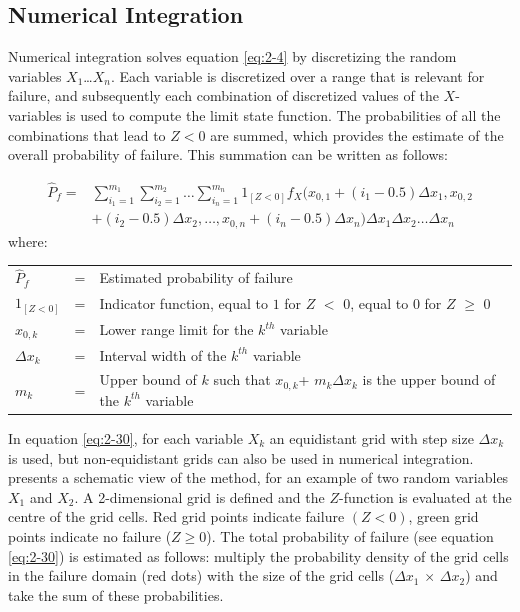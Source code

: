 \subsection{Numerical Integration\label{sec:numericalintegration}}
Numerical integration solves equation \eqref{eq:2-4} by discretizing the random variables $X_1$\dots $X_n$. Each variable is discretized over a range that is relevant for failure, and subsequently each combination of discretized values of the $X$-variables is used to compute the limit state function. The probabilities of all the combinations that lead to $Z<0$ are summed, which provides the estimate of the overall probability of failure. This summation can be written as follows:

\begin{align}
\hat{P}_{f} =&\sum _{i_{1} =1}^{m_{1} }\sum _{i_{2} =1}^{m_{2} }\dots\sum _{i_{n} =1}^{m_{n} }1_{\left[Z<0\right]}    f_{X} (x_{0,1} +(i_{1} -0.5)\Delta x_{1} ,x_{0,2}\label{eq:2-30} \\ \nonumber
 &+(i_{2} -0.5)\Delta x_{2} ,\dots,x_{0,n} +(i_{n} -0.5)\Delta x_{n} )\Delta x_{1} \Delta x_{2} \dots\Delta x_{n} 
\end{align}
where:

\begin{tabular}{p{0.4in}p{0.2in}p{4in}} 
$\hat{P}_{f} $ & = & Estimated probability of failure \\
$1_{\left[Z<0\right]} $ & = & Indicator function, equal to $1$ for $Z$ $<$ $0$, equal to $0$ for $Z$ $\geq$ $0$ \\
$x_{0,k}$ & = & Lower range limit for the $k^{th}$ variable \\
$\Delta$$x_k$ & = & Interval width of the $k^{th}$ variable \\
$m_k$ & = & Upper bound of $k$ such that $x_{0,k}$+ $m_k$$\Delta$$x_k$ is the upper bound of the $k^{th}$ variable  \\
\end{tabular}

In equation \eqref{eq:2-30}, for each variable $X_k$ an equidistant grid with step size $\Delta$$x_k$ is used, but non-equidistant grids can also be used in numerical integration.  presents a schematic view of the method, for an example of two random variables $X_1$ and $X_2$. A 2-dimensional grid is defined and the $Z$-function is evaluated at the centre of the grid cells. Red grid points indicate failure $(Z<0)$, green grid points indicate no failure ($Z\geq0$). The total probability of failure (see equation \eqref{eq:2-30}) is estimated as follows: multiply the probability density of the grid cells in the failure domain (red dots) with the size of the grid cells ($\Delta$$x_1$ $\times$ $\Delta$$x_2$) and take the sum of these probabilities.

